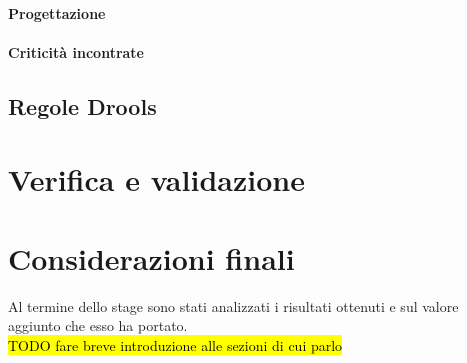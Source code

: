 	\paragraph{Progettazione}
	\paragraph{Criticità incontrate}
		

\newpage
\subsection{Regole Drools}

\newpage
\section{Verifica e validazione}
\newpage
\section{Considerazioni finali}
	Al termine dello stage sono stati analizzati i risultati ottenuti e sul valore aggiunto che esso ha portato.\\
	\hl{TODO fare breve introduzione alle sezioni di cui parlo}	


























